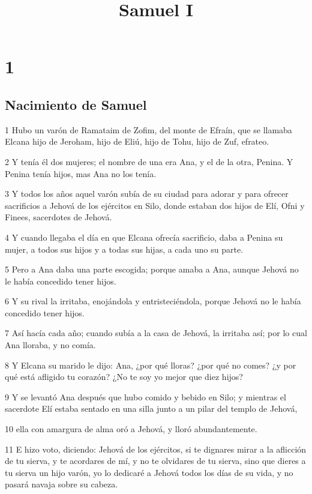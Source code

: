 

\title{Samuel I}

\chapter{1}

\section*{Nacimiento de Samuel}

\par 1 Hubo un varón de Ramataim de Zofim, del monte de Efraín, que se llamaba Elcana hijo de Jeroham, hijo de Eliú, hijo de Tohu, hijo de Zuf, efrateo.
\par 2 Y tenía él dos mujeres; el nombre de una era Ana, y el de la otra, Penina. Y Penina tenía hijos, mas Ana no los tenía.
\par 3 Y todos los años aquel varón subía de su ciudad para adorar y para ofrecer sacrificios a Jehová de los ejércitos en Silo, donde estaban dos hijos de Elí, Ofni y Finees, sacerdotes de Jehová.
\par 4 Y cuando llegaba el día en que Elcana ofrecía sacrificio, daba a Penina su mujer, a todos sus hijos y a todas sus hijas, a cada uno su parte.
\par 5 Pero a Ana daba una parte escogida; porque amaba a Ana, aunque Jehová no le había concedido tener hijos.
\par 6 Y su rival la irritaba, enojándola y entristeciéndola, porque Jehová no le había concedido tener hijos.
\par 7 Así hacía cada año; cuando subía a la casa de Jehová, la irritaba así; por lo cual Ana lloraba, y no comía.
\par 8 Y Elcana su marido le dijo: Ana, ¿por qué lloras? ¿por qué no comes? ¿y por qué está afligido tu corazón? ¿No te soy yo mejor que diez hijos?
\par 9 Y se levantó Ana después que hubo comido y bebido en Silo; y mientras el sacerdote Elí estaba sentado en una silla junto a un pilar del templo de Jehová,
\par 10 ella con amargura de alma oró a Jehová, y lloró abundantemente.
\par 11 E hizo voto, diciendo: Jehová de los ejércitos, si te dignares mirar a la aflicción de tu sierva, y te acordares de mí, y no te olvidares de tu sierva, sino que dieres a tu sierva un hijo varón, yo lo dedicaré a Jehová todos los días de su vida, y no pasará navaja sobre su cabeza. 
